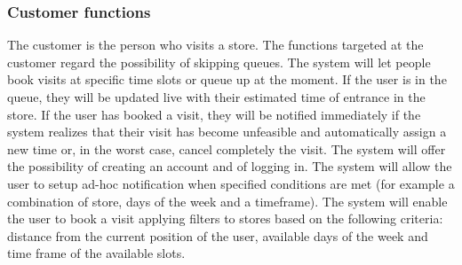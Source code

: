 \subsubsection{Customer functions}
The customer is the person who visits a store.
The functions targeted at the customer regard the possibility of skipping queues.
The system will let people book visits at specific time slots or queue up at the moment.
If the user is in the queue, they will be updated live with their estimated time of entrance in the store.
If the user has booked a visit, they will be notified immediately if the system realizes that
their visit has become unfeasible and automatically assign a new time or, in the worst case, cancel completely the visit.
The system will offer the possibility of creating an account and of logging in.
The system will allow the user to setup ad-hoc notification when specified conditions are met (for example a combination of store, days of the week and a timeframe).
The system will enable the user to book a visit applying filters to stores based on the following criteria: distance from the current position of the user, available days of the week and time frame of the available slots.  


